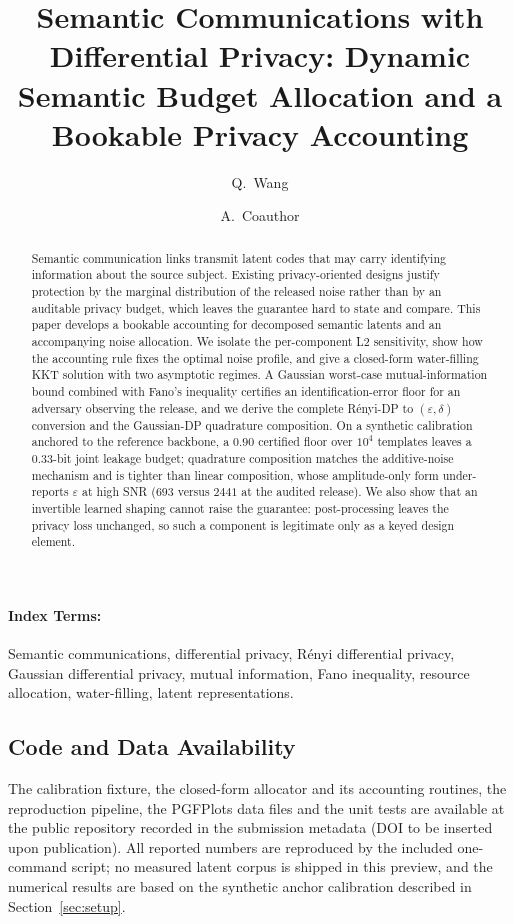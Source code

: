 \documentclass[10pt,twocolumn,letterpaper]{article}
\newenvironment{IEEEkeywords}{\paragraph{Index Terms:}}{}
\begin{document}
\title{Semantic Communications with Differential Privacy: Dynamic Semantic
Budget Allocation and a Bookable Privacy Accounting}
\author{Q.~Wang \and A.~Coauthor}
\date{}
\maketitle

\begin{abstract}
Semantic communication links transmit latent codes that may carry identifying
information about the source subject. Existing privacy-oriented designs
justify protection by the marginal distribution of the released noise rather
than by an auditable privacy budget, which leaves the guarantee hard to state
and compare. This paper develops a bookable accounting for decomposed semantic
latents and an accompanying noise allocation. We isolate the per-component L2
sensitivity, show how the accounting rule fixes the optimal noise profile, and
give a closed-form water-filling KKT solution with two asymptotic regimes. A
Gaussian worst-case mutual-information bound combined with Fano's inequality
certifies an identification-error floor for an adversary observing the
release, and we derive the complete R\'enyi-DP to $(\varepsilon,\delta)$
conversion and the Gaussian-DP quadrature composition. On a synthetic
calibration anchored to the reference backbone, a $0.90$ certified floor over
$10^{4}$ templates leaves a $0.33$-bit joint leakage budget; quadrature
composition matches the additive-noise mechanism and is tighter than linear
composition, whose amplitude-only form under-reports $\varepsilon$ at high SNR
($693$ versus $2441$ at the audited release). We also show that an invertible
learned shaping cannot raise the guarantee: post-processing leaves the privacy
loss unchanged, so such a component is legitimate only as a keyed design
element.
\end{abstract}

\begin{IEEEkeywords}
Semantic communications, differential privacy, R\'enyi differential privacy,
Gaussian differential privacy, mutual information, Fano inequality, resource
allocation, water-filling, latent representations.
\end{IEEEkeywords}





\subsection*{Code and Data Availability}
The calibration fixture, the closed-form allocator and its accounting
routines, the reproduction pipeline, the PGFPlots data files and the unit
tests are available at the public repository recorded in the submission
metadata (DOI to be inserted upon publication). All reported numbers are
reproduced by the included one-command script; no measured latent corpus is
shipped in this preview, and the numerical results are based on the synthetic
anchor calibration described in Section~\ref{sec:setup}.
\end{document}
